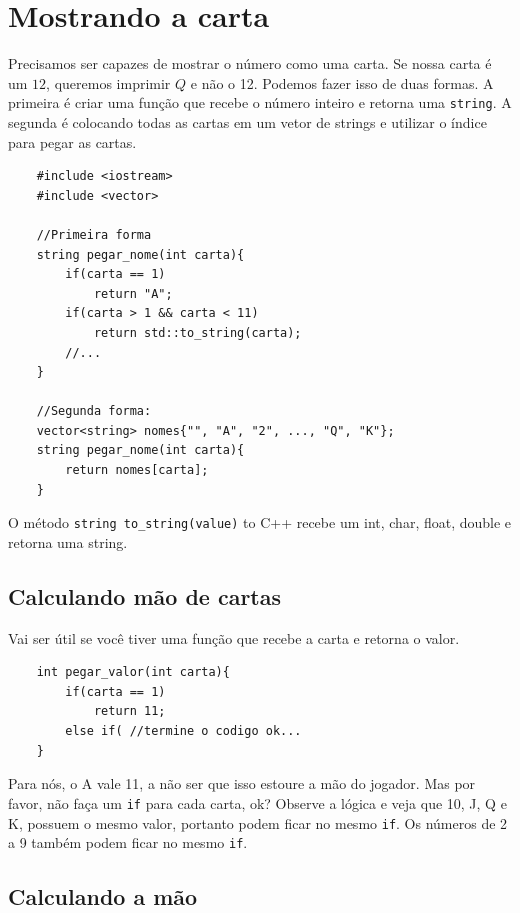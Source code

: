 \documentclass[12pt]{article}
\newcommand{\code}[1]{\lstinline|#1|} %
\begin{document}
\section{Mostrando a carta}

Precisamos ser capazes de mostrar o número como uma carta. Se nossa carta é um
$12$, queremos imprimir $Q$ e não o 12. Podemos fazer isso de duas formas.
A primeira é criar uma função que recebe o número inteiro e retorna uma
\code{string}. A segunda é colocando todas as cartas em um vetor de strings e
utilizar o índice para pegar as cartas.


\begin{mdframed}[nobreak=true]
	\begin{lstlisting}
	#include <iostream>
	#include <vector>

	//Primeira forma
	string pegar_nome(int carta){
		if(carta == 1)
			return "A";
		if(carta > 1 && carta < 11)
			return std::to_string(carta);
		//...
	}

	//Segunda forma:  
	vector<string> nomes{"", "A", "2", ..., "Q", "K"};
	string pegar_nome(int carta){
		return nomes[carta];
	}
	\end{lstlisting}
\end{mdframed}

O método \code{string to_string(value)} to C++ recebe um int, char, float,
double e retorna uma string. 

\subsection{Calculando mão de cartas}

Vai ser útil se você tiver uma função que recebe a carta e retorna o valor.

	\begin{lstlisting}
	int pegar_valor(int carta){
		if(carta == 1)
			return 11;
		else if( //termine o codigo ok...
	}
	\end{lstlisting}

Para nós, o A vale 11, a não ser que isso estoure a mão do jogador. Mas por favor,
não faça um \code{if} para cada carta, ok? Observe a lógica e veja que 10, J, Q
e K, possuem o mesmo valor, portanto podem ficar no mesmo \code{if}. Os números
de 2 a 9 também podem ficar no mesmo \code{if}.

\subsection{Calculando a mão}
\end{document}
